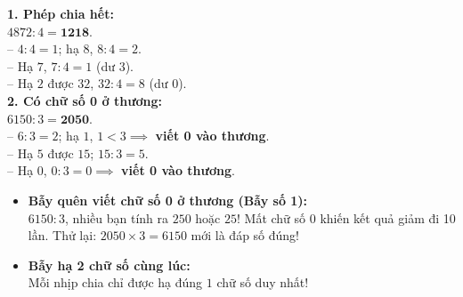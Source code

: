 \documentclass[11pt,a4paper]{article}
\begin{document}
\vspace{-2.5mm}
\noindent
\begin{minipage}[t]{0.49\textwidth}\vspace{0pt}
\begin{tcolorbox}[
  enhanced,
  colback=green!4!white,
  colframe=green!60!black,
  arc=2mm, boxrule=0.8pt,
  left=2mm, right=2mm, top=1.8mm, bottom=1.8mm,
  title={\footnotesize\bfseries\color{white}\faCheckCircle\ Ví dụ thực hành chuẩn mực}
]
{\footnotesize
\textbf{1. Phép chia hết:}\\
$4872 : 4 = \mathbf{1218}$.\\
-- $4 : 4 = 1$; hạ $8$, $8 : 4 = 2$.\\
-- Hạ $7$, $7 : 4 = 1$ (dư $3$).\\
-- Hạ $2$ được $32$, $32 : 4 = 8$ (dư $0$).\\
\textbf{2. Có chữ số 0 ở thương:}\\
$6150 : 3 = \mathbf{2050}$.\\
-- $6 : 3 = 2$; hạ $1$, $1 < 3 \implies$ \textbf{viết 0 vào thương}.\\
-- Hạ $5$ được $15$; $15 : 3 = 5$.\\
-- Hạ $0$, $0 : 3 = 0 \implies$ \textbf{viết 0 vào thương}.
}
\end{tcolorbox}
\end{minipage}
\hfill
\begin{minipage}[t]{0.49\textwidth}\vspace{0pt}
\begin{tcolorbox}[
  enhanced,
  colback=red!4!white,
  colframe=red!70!black,
  arc=2mm, boxrule=0.8pt,
  left=2mm, right=2mm, top=1.8mm, bottom=1.8mm,
  title={\footnotesize\bfseries\color{white}\faExclamationTriangle\ Mẹo tránh bẫy trắc nghiệm}
]
{\footnotesize
\begin{itemize}\setlength{\itemsep}{1.5pt}\setlength{\leftskip}{-2.5mm}
  \item \textbf{Bẫy quên viết chữ số 0 ở thương (Bẫy số 1):}\\
  $6150 : 3$, nhiều bạn tính ra $250$ hoặc $25$! Mất chữ số 0 khiến kết quả giảm đi 10 lần. Thử lại: $2050 \times 3 = 6150$ mới là đáp số đúng!
  \item \textbf{Bẫy hạ 2 chữ số cùng lúc:}\\
  Mỗi nhịp chia chỉ được hạ đúng $1$ chữ số duy nhất!
\end{itemize}
}
\end{tcolorbox}
\end{minipage}
\end{document}
